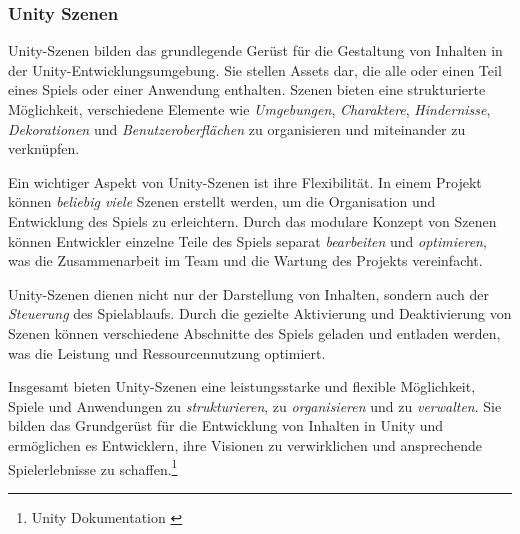 \subsubsection{Unity Szenen}
Unity-Szenen bilden das grundlegende Gerüst für die Gestaltung von Inhalten in der Unity-Entwicklungsumgebung. Sie stellen
Assets dar, die alle oder einen Teil eines Spiels oder einer Anwendung enthalten. Szenen bieten eine strukturierte Möglichkeit,
verschiedene Elemente wie \textit{Umgebungen}, \textit{Charaktere}, \textit{Hindernisse}, \textit{Dekorationen} und
\textit{Benutzeroberflächen} zu organisieren und miteinander zu verknüpfen.

Ein wichtiger Aspekt von Unity-Szenen ist ihre Flexibilität. In einem Projekt können \textit{beliebig viele} Szenen erstellt werden,
um die Organisation und Entwicklung des Spiels zu erleichtern. Durch das modulare Konzept von Szenen können Entwickler
einzelne Teile des Spiels separat \textit{bearbeiten} und \textit{optimieren}, was die Zusammenarbeit im Team und die
Wartung des Projekts vereinfacht.

Unity-Szenen dienen nicht nur der Darstellung von Inhalten, sondern auch der \textit{Steuerung} des Spielablaufs. Durch die gezielte
Aktivierung und Deaktivierung von Szenen können verschiedene Abschnitte des Spiels geladen und entladen werden, was die
Leistung und Ressourcennutzung optimiert.

Insgesamt bieten Unity-Szenen eine leistungsstarke und flexible Möglichkeit, Spiele und Anwendungen zu \textit{strukturieren}, zu
\textit{organisieren} und zu \textit{verwalten}. Sie bilden das Grundgerüst für die Entwicklung von Inhalten in Unity und ermöglichen es
Entwicklern, ihre Visionen zu verwirklichen und ansprechende Spielerlebnisse zu schaffen.\footnote{Unity Dokumentation \cite{Scenes}}

